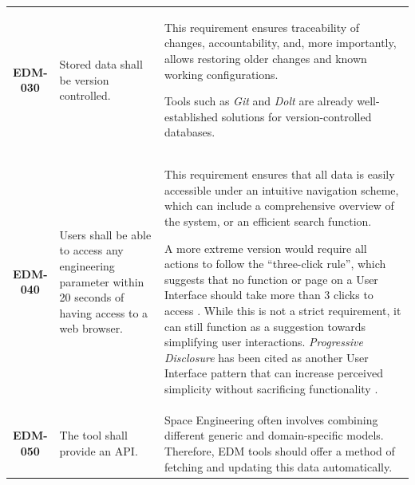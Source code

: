 \documentclass[a4paper,nobib,justified,final]{tufte-book}
\begin{document}
\begin{table}[h]
\begin{tabularx}{\textwidth}{cp{4cm}X}
		\\
		\textbf{EDM-030} & Stored data shall be version controlled. &
		This requirement ensures traceability of changes, accountability, and, more importantly, allows restoring older changes and known working configurations.
		
		Tools such as \emph{Git} and \emph{Dolt} are already well-established solutions for version-controlled databases.
		
		\\
		\textbf{EDM-040} & Users shall be able to access any engineering parameter within 20 seconds of having access to a web browser. &  This requirement ensures that all data is easily accessible under an intuitive navigation scheme, which can include a comprehensive overview of the system, or an efficient search function.
		
		A more extreme version would require all actions to follow the ``three-click rule'', which suggests that no function or page on a User Interface should take more than 3 clicks to access \cite{glasseyProximityIndicatorEGovernment2005}. While this is not a strict requirement, it can still function as a suggestion towards simplifying user interactions. \emph{Progressive Disclosure} has been cited as another User Interface pattern that can increase perceived simplicity without sacrificing functionality \cite{springerProgressiveDisclosureWhen2020,ProgressiveDisclosure}.
		
		\\
		\textbf{EDM-050} & The tool shall provide an \acf{API}. &      Space Engineering often involves combining different generic and domain-specific models. Therefore, \acs{EDM} tools should offer a method of fetching and updating this data automatically.
		
		

\end{tabularx}
\end{table}
\end{document}
